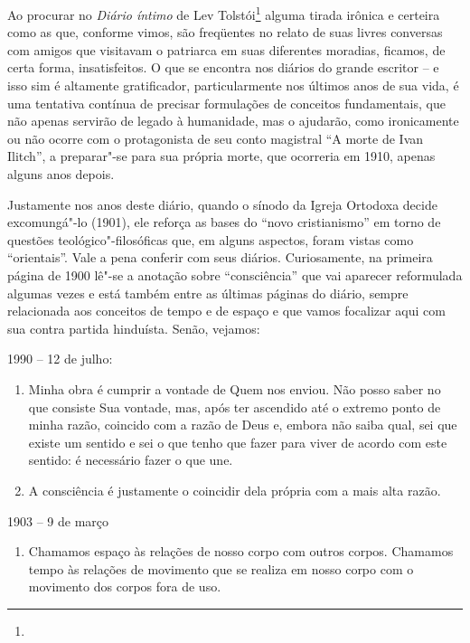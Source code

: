 Ao procurar no \emph{Diário íntimo} de Lev Tolstói\footnote{} alguma
tirada irônica e certeira como as que, conforme vimos, são freqüentes no
relato de suas livres conversas com amigos que visitavam o patriarca em
suas diferentes moradias, ficamos, de certa forma, insatisfeitos. O que
se encontra nos diários do grande escritor -- e isso sim é altamente
gratificador, particularmente nos últimos anos de sua vida, é uma
tentativa contínua de precisar formulações de conceitos fundamentais,
que não apenas servirão de legado à humanidade, mas o ajudarão, como
ironicamente ou não ocorre com o protagonista de seu conto magistral ``A
morte de Ivan Ilitch'', a preparar"-se para sua própria morte, que
ocorreria em 1910, apenas alguns anos depois.

Justamente nos anos deste diário, quando o sínodo da Igreja Ortodoxa
decide excomungá"-lo (1901), ele reforça as bases do ``novo
cristianismo'' em torno de questões teológico"-filosóficas que, em alguns
aspectos, foram vistas como ``orientais''. Vale a pena conferir com seus
diários. Curiosamente, na primeira página de 1900 lê"-se a anotação sobre
``consciência'' que vai aparecer reformulada algumas vezes e está também
entre as últimas páginas do diário, sempre relacionada aos conceitos de
tempo e de espaço e que vamos focalizar aqui com sua contra partida
hinduísta. Senão, vejamos:

1990 -- 12 de julho:

\begin{enumerate}
\def\labelenumi{\arabic{enumi})}
\item
  Minha obra é cumprir a vontade de Quem nos enviou. Não posso saber no
  que consiste Sua vontade, mas, após ter ascendido até o extremo ponto
  de minha razão, coincido com a razão de Deus e, embora não saiba qual,
  sei que existe um sentido e sei o que tenho que fazer para viver de
  acordo com este sentido: é necessário fazer o que une.
\item
  A consciência é justamente o coincidir dela própria com a mais alta
  razão.
\end{enumerate}

1903 -- 9 de março

\begin{enumerate}
\def\labelenumi{\arabic{enumi})}
\setcounter{enumi}{2}
\item
  Chamamos espaço às relações de nosso corpo com outros corpos. Chamamos
  tempo às relações de movimento que se realiza em nosso corpo com o
  movimento dos corpos fora de uso.
\end{enumerate}

